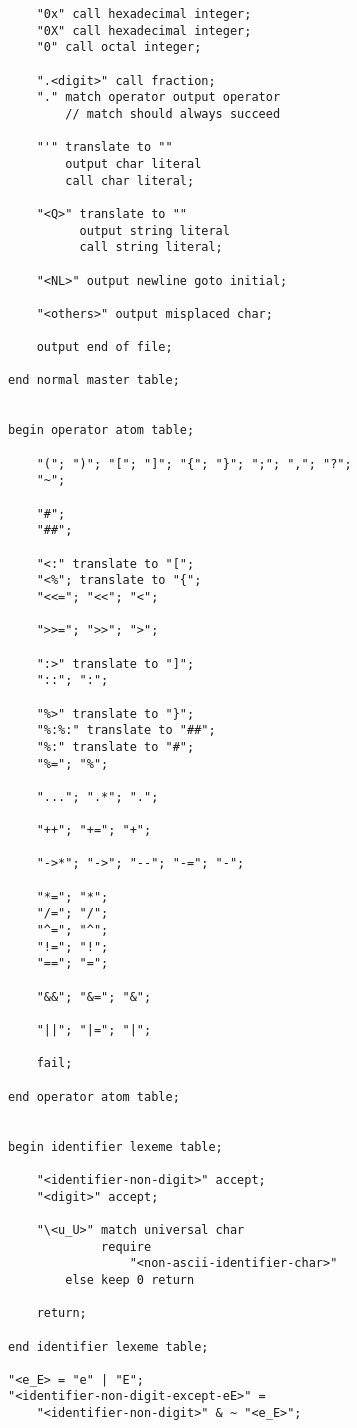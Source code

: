 \documentclass[12pt]{article}
\newenvironment{indpar}[1][0.3in]%
	{\begin{list}{}%
		     {\setlength{\itemsep}{0in}%
		      \setlength{\topsep}{0in}%
		      \setlength{\parsep}{1ex}%
		      \setlength{\labelwidth}{#1}%
		      \setlength{\leftmargin}{#1}%
		      \addtolength{\leftmargin}{\labelsep}}%
	 \item}%
	{\end{list}}
\begin{document}
\begin{indpar}
\begin{verbatim}
    "0x" call hexadecimal integer;
    "0X" call hexadecimal integer;
    "0" call octal integer;

    ".<digit>" call fraction;
    "." match operator output operator
        // match should always succeed

    "'" translate to ""
        output char literal
        call char literal;

    "<Q>" translate to ""
          output string literal
          call string literal;

    "<NL>" output newline goto initial;

    "<others>" output misplaced char;

    output end of file;

end normal master table;


begin operator atom table;

    "("; ")"; "["; "]"; "{"; "}"; ";"; ","; "?";
    "~";

    "#";
    "##";

    "<:" translate to "[";
    "<%"; translate to "{";
    "<<="; "<<"; "<";

    ">>="; ">>"; ">";

    ":>" translate to "]";
    "::"; ":";

    "%>" translate to "}";
    "%:%:" translate to "##";
    "%:" translate to "#";
    "%="; "%";

    "..."; ".*"; ".";

    "++"; "+="; "+";

    "->*"; "->"; "--"; "-="; "-";

    "*="; "*";
    "/="; "/";
    "^="; "^";
    "!="; "!";
    "=="; "=";

    "&&"; "&="; "&";

    "||"; "|="; "|";

    fail;

end operator atom table;


begin identifier lexeme table;

    "<identifier-non-digit>" accept;
    "<digit>" accept;

    "\<u_U>" match universal char
             require
                 "<non-ascii-identifier-char>"
        else keep 0 return

    return;

end identifier lexeme table;

"<e_E> = "e" | "E";
"<identifier-non-digit-except-eE>" =
    "<identifier-non-digit>" & ~ "<e_E>";



\end{verbatim}
\end{indpar}
\end{document}
